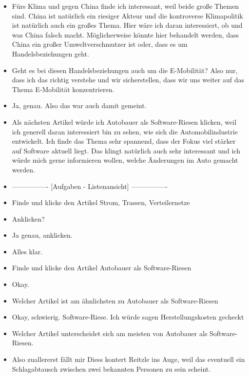 {\begin{itemize}[]
        \item {} \flqq Fürs Klima und gegen China\frqq{} finde ich interessant, weil beide große Themen sind.
              China ist natürlich ein riesiger Akteur und die kontroverse Klimapolitik ist natürlich auch ein großes Thema.
              Hier wäre ich daran interessiert, ob und was China falsch macht.
              Möglicherweise könnte hier behandelt werden, dass China ein großer Umweltverschmutzer ist oder, dass es um Handelsbeziehungen geht.
        \item {} Geht es bei diesen Handelsbeziehungen auch um die E-Mobilität?
              Also nur, dass ich das richtig verstehe und wir sicherstellen, dass wir uns weiter auf das Thema E-Mobilität konzentrieren.
        \item {} Ja, genau. Also das war auch damit gemeint.
        \item {} Als nächsten Artikel würde ich \flqq Autobauer als Software-Riesen\frqq{} klicken, weil ich generell daran interessiert bin zu sehen, wie sich die Automobilindustrie entwickelt.
              Ich finde das Thema sehr spannend, dass der Fokus viel stärker auf Software aktuell liegt.
              Das klingt natürlich auch sehr interessant und ich würde mich gerne informieren wollen, welche Änderungen im Auto gemacht werden.
        \item {----------------} [Aufgaben - Listenansicht] {----------------}
        \item {} Finde und klicke den Artikel \flqq Strom, Trassen, Verteilernetze\frqq{}
        \item {} Anklicken?
        \item {} Ja genau, anklicken.
        \item {} Alles klar.
        \item {} Finde und klicke den Artikel \flqq Autobauer als Software-Riesen\frqq{}
        \item {} Okay.
        \item {} Welcher Artikel ist am ähnlichsten zu \flqq Autobauer als Software-Riesen\frqq{}
        \item {} Okay, schwierig. Software-Riese. Ich würde sagen \flqq Herstellungskosten gecheckt\frqq{}
        \item {} Welcher Artikel unterscheidet sich am meisten von \flqq Autobauer als Software-Riesen\frqq{}.
        \item {} Also zuallererst fällt mir Diess kontert Reitzle ins Auge, weil das eventuell ein Schlagabtausch zwischen zwei bekannten Personen zu sein scheint.

\end{itemize}}
